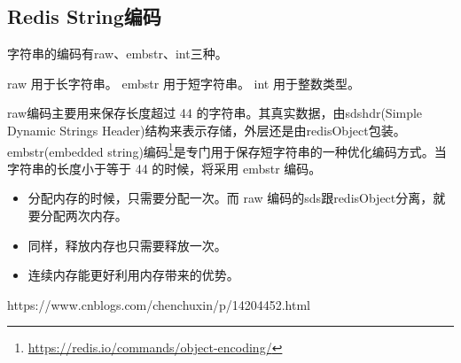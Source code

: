 \documentclass[../../../interview-questions.tex]{subfiles}
\begin{document}
\subsection{Redis String编码}

字符串的编码有raw、embstr、int三种。

raw 用于长字符串。
embstr 用于短字符串。
int 用于整数类型。

raw编码主要用来保存长度超过 44 的字符串。其真实数据，由sdshdr(Simple Dynamic Strings Header)结构来表示存储，外层还是由redisObject包装。embstr(embedded string)编码\footnote{\url{https://redis.io/commands/object-encoding/}}是专门用于保存短字符串的一种优化编码方式。当字符串的长度小于等于 44 的时候，将采用 embstr 编码。

\begin{itemize}
    \item {分配内存的时候，只需要分配一次。而 raw 编码的sds跟redisObject分离，就要分配两次内存。}
    \item {同样，释放内存也只需要释放一次。}
    \item {连续内存能更好利用内存带来的优势。}
\end{itemize}

https://www.cnblogs.com/chenchuxin/p/14204452.html
\end{document}
